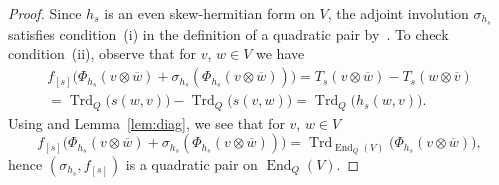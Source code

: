 \documentclass{amsart}
\DeclareMathOperator{\End}{End}
\DeclareMathOperator{\Trd}{Trd}
\theoremstyle{remark}
\begin{document}
\begin{proof}
  Since $h_s$ is an even skew-hermitian form on $V$, the adjoint
  involution $\sigma_{h_s}$ satisfies condition~(i) in the definition
  of a quadratic pair by~\cite[(2.6)\,\&\,(4.2)]{BoI}. To check condition~(ii),
  observe that for $v$, $w\in V$ we have
\begin{multline*}
  f_{[s]}\bigl(\Phi_{h_s}(v\otimes\overline w) +
  \sigma_{h_s}(\Phi_{h_s}(v\otimes\overline w))\bigr) =
  T_s(v\otimes\overline w) - T_s(w\otimes\overline v)
  \\
  =\Trd_Q\bigl(s(w,v)\bigr) - \Trd_Q\bigl(s(v,w)\bigr) =
  \Trd_Q\bigl(h_s(w,v)\bigr). 
\end{multline*}
Using \cite[(5.1)]{BoI} and Lemma~\ref{lem:diag}, we see that for $v$, $w\in V$
\[
  f_{[s]}\bigl(\Phi_{h_s}(v\otimes\overline w) +
  \sigma_{h_s}(\Phi_{h_s}(v\otimes\overline w))\bigr) =
  \Trd_{\End_Q(V)}\bigl(\Phi_{h_s}(v\otimes\overline w)\bigr),
\]
hence $(\sigma_{h_s},f_{[s]})$ is a quadratic pair on $\End_Q(V)$.
\medbreak


\end{proof}
\end{document}
